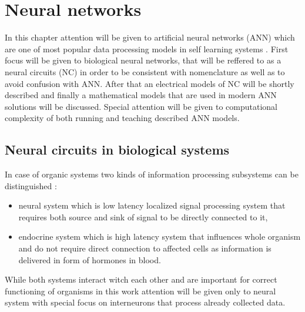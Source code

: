 \chapter{Neural networks}
\FloatBarrier

In this chapter attention will be given to artificial neural networks (ANN) which are one of most 
popular data processing models in self learning systems \cite{Abiodun2019} \cite{Tran2021}
\cite{Syed2021}. First focus will be given to biological neural networks, that will be reffered 
to as a neural circuits (NC) in order to be consistent with nomenclature \cite{Purves2001} as 
well as to avoid confusion with ANN.  
After that an electrical models of NC will be shortly described and finally a mathematical models
that are used in modern ANN solutions will be discussed. Special attention will be given to 
computational complexity of both running and teaching described ANN models. 



\section{Neural circuits in biological systems}
\FloatBarrier
In case of organic systems two kinds of information processing subsystems can be distinguished
\cite{Johnson2016}:
\begin{itemize}
	\item neural system which is low latency localized signal processing system that requires
	both source and sink of signal to be directly connected to it, 
	\item endocrine system which is high latency system that influences whole organism and do 
	not require direct connection to affected cells as information is delivered in form of 
	hormones in blood.
\end{itemize}
While both systems interact witch each other and are important for correct functioning of 
organisms \cite{Schwarz2019} in this work attention will be given only to neural system with
special focus on interneurons that process already collected data.


